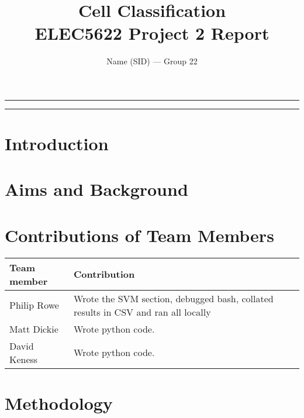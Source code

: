 \documentclass{article}
\title{\bfseries Cell Classification \\ \vspace{1.5em}
\large ELEC5622 Project 2 Report}
\author{Name (SID) --- Group 22}
\begin{document}
\rule{\textwidth}{1pt}

\begin{minipage}[h]{\textwidth}
    \sffamily\maketitle
\end{minipage}

\vspace{1.5em}

\rule{\textwidth}{1pt}

\vspace{1em}

{
    \centering

\thispagestyle{empty}

\newpage

{\large\tableofcontents}
\thispagestyle{empty}

}

\newpage

\setcounter{page}{1}

\section{Introduction}


\section{Aims and Background}


\section{Contributions of Team Members}

\begin{table}[!h]
    \begin{tabularx}{\linewidth}{l X}
        \toprule
        Team member & Contribution \\
        \midrule
        Philip Rowe & Wrote the SVM section, debugged bash, collated results in CSV and ran all locally \\
        Matt Dickie & Wrote python code. \\
        David Keness & Wrote python code. \\
        \bottomrule
    \end{tabularx}
\end{table}

\section{Methodology}
\end{document}
